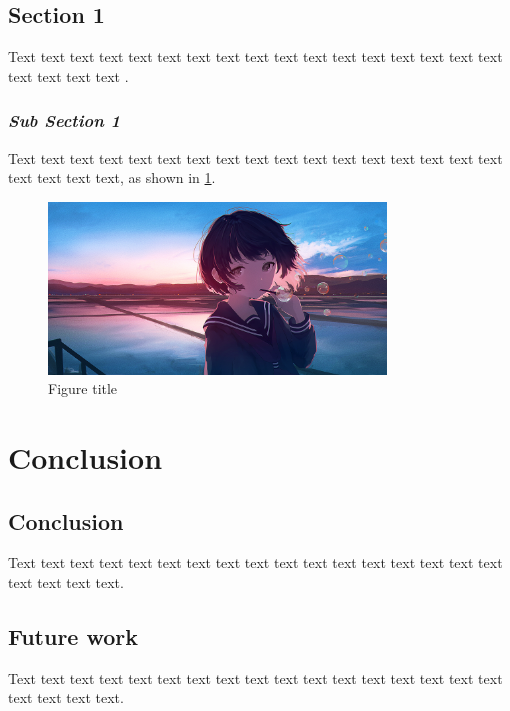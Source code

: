 \documentclass[12pt,a4paper]{article}
\numberwithin{equation}{section}
\begin{document}
{{\subsection{Section 1}
\hspace{2em}Text text text text text text text text text text text text text text text text text text text text text \cite{6}.
\subsubsection{\textit{Sub Section 1}}
\hspace{2em}Text text text text text text text text text text text text text text text text text text text text text, as shown in \cref{fig:5- 1}.
\begin{figure}[h]
    \centering
    \includegraphics[width=0.8\textwidth, height=0.8\textwidth]{Fig example.png}
    \caption{Figure title}
    \label{fig:5- 1}
\end{figure}

\section{Conclusion}
\subsection{Conclusion}
\hspace{2em}Text text text text text text text text text text text text text text text text text text text text text.
\subsection{Future work}
\hspace{2em}Text text text text text text text text text text text text text text text text text text text text text.

}}
\end{document}
